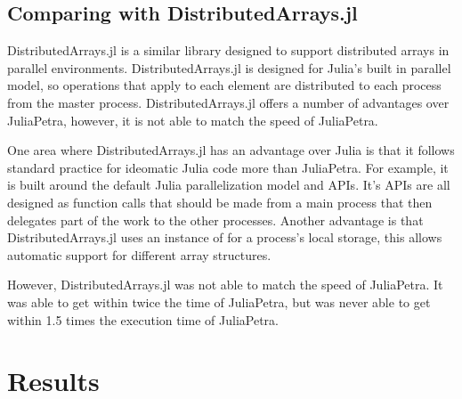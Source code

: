 \documentclass[acmsmall]{acmart}
\newcommand{\juliaSnippet}[1]{\texttt{\detokenize{#1}}}
\begin{document}
\subsection{Comparing with DistributedArrays.jl}

DistributedArrays.jl is a similar library designed to support distributed arrays in parallel environments.
\cite{DAGithub}
DistributedArrays.jl is designed for Julia's built in parallel model, so operations that apply to
each element are distributed to each process from the master process.
DistributedArrays.jl offers a number of advantages over JuliaPetra, however, it is not able to
match the speed of JuliaPetra.

One area where DistributedArrays.jl has an advantage over Julia is that it follows standard
practice for ideomatic Julia code more than JuliaPetra.
For example, it is built around the default Julia parallelization model and APIs.
It's APIs are all designed as function calls that should be made from a main process that
then delegates part of the work to the other processes. %
Another advantage is that DistributedArrays.jl uses an instance of \juliaSnippet{AbstractArray}
for a process's local storage, this allows automatic support for different array structures.

However, DistributedArrays.jl was not able to match the speed of JuliaPetra.
It was able to get within twice the time of JuliaPetra, but was never able to get within 1.5 times
the execution time of JuliaPetra.

\section{Results}
\end{document}
